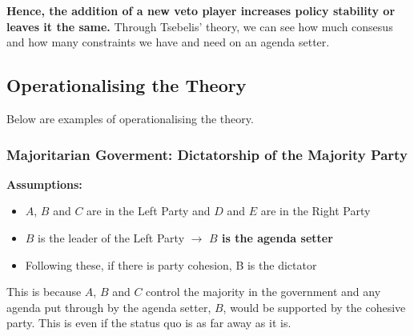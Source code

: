 \documentclass[12pt, letterpaper]{article}
\begin{document}
\textbf{Hence, the addition of a new veto player increases policy stability or leaves it the same.} Through Tsebelis' theory, we can see how much consesus and how many constraints we have and need on an agenda setter.

\subsection{Operationalising the Theory}
Below are examples of operationalising the theory.
\subsubsection{Majoritarian Goverment: Dictatorship of the Majority Party}
\textbf{Assumptions:}
\begin{itemize}
	\item $A$, $B$ and $C$ are in the Left Party and $D$ and $E$ are in the Right Party
	\item $B$ is the leader of the Left Party $\rightarrow$ \textbf{$B$ is the agenda setter}
	\item Following these, if there is party cohesion, B is the dictator
\end{itemize}

\begin{center}
\end{center}
This is because $A$, $B$ and $C$ control the majority in the government and any agenda put through by the agenda setter, $B$, would be supported by the cohesive party. This is even if the status quo is as far away as it is.
\end{document}
